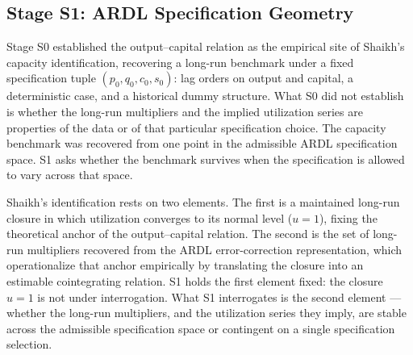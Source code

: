 \documentclass[11pt,a4paper]{article}
\begin{document}

\subsection{Stage S1: ARDL Specification Geometry}
\label{sec:S1}


Stage S0 established the output--capital relation as the empirical site of
Shaikh's capacity identification, recovering a long-run benchmark under a fixed
specification tuple $(p_0, q_0, c_0, s_0)$: lag orders on output and capital, a
deterministic case, and a historical dummy structure. What S0 did not establish
is whether the long-run multipliers and the implied utilization series are
properties of the data or of that particular specification choice. The
capacity benchmark was recovered from one point in the admissible ARDL
specification space. S1 asks whether the benchmark survives when the
specification is allowed to vary across that space.


Shaikh's identification rests on two elements. The first is a maintained
long-run closure in which utilization converges to its normal level ($u = 1$),
fixing the theoretical anchor of the output--capital relation. The second is
the set of long-run multipliers recovered from the ARDL error-correction
representation, which operationalize that anchor empirically by translating
the closure into an estimable cointegrating relation. S1 holds the first
element fixed: the closure $u = 1$ is not under interrogation. What S1
interrogates is the second element --- whether the long-run multipliers, and
the utilization series they imply, are stable across the admissible
specification space or contingent on a single specification selection.

\end{document}

